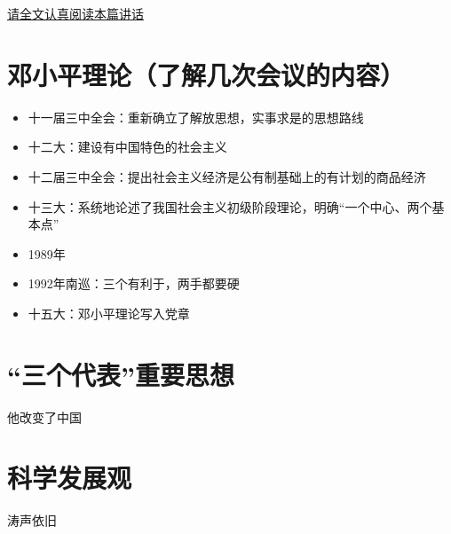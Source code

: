 \documentclass[a4paper, UTF8]{ctexart}
\begin{document}
    \href{http://www.xinhuanet.com//politics/2013-12/26/c_118723453.htm}{请全文认真阅读本篇讲话}

\section{邓小平理论（了解几次会议的内容）}
    \begin{itemize}
        \item 十一届三中全会：重新确立了解放思想，实事求是的思想路线
        \item 十二大：建设有中国特色的社会主义
        \item 十二届三中全会：提出社会主义经济是公有制基础上的有计划的商品经济
        \item 十三大：系统地论述了我国社会主义初级阶段理论，明确“一个中心、两个基本点”
        \item 1989年
        \item 1992年南巡：三个有利于，两手都要硬
        \item 十五大：邓小平理论写入党章
    \end{itemize}

\section{“三个代表”重要思想}
    他改变了中国

\section{科学发展观}
    涛声依旧
\end{document}
